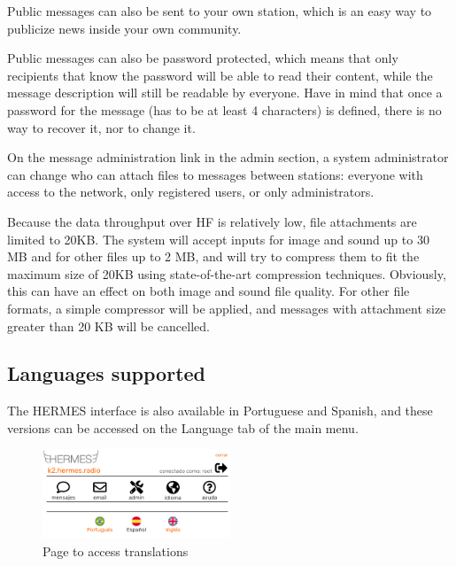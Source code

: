 \documentclass[11pt,a4paper]{article}
\begin{document}
Public messages can also be sent to your own station, which is an easy way to publicize news inside your own community.

Public messages can also be password protected, which means that only recipients that know the password will be able to read their content, while the message description will still be readable by everyone. Have in mind that once a password for the message (has to be at least 4 characters) is defined, there is no way to recover it, nor to change it.

On the message administration link in the admin section, a system administrator can change who can attach files to messages between stations: everyone with access to the network, only registered users, or only administrators. 

Because the data throughput over HF is relatively low, file attachments are limited to 20KB. The system will accept inputs for image and sound up to 30 MB and for other files up to 2 MB, and will try to compress them to fit the maximum size of 20KB using state-of-the-art compression techniques. Obviously, this can have an effect on both image and sound file quality. For other file formats, a simple compressor will be applied, and messages with attachment size greater than 20 KB will be cancelled.%



\subsection{Languages supported}
\label{langs}

The HERMES interface is also available in Portuguese and Spanish, and these versions can be accessed on the Language tab of the main menu.

\begin{figure}[H]
    \centering
    \includegraphics[width=0.5\textwidth]{screenshots/frontend/es/languages.png}
    \caption{Page to access translations}
	\vspace{-10pt}
    \label{fig:languages}
\end{figure}
\end{document}
